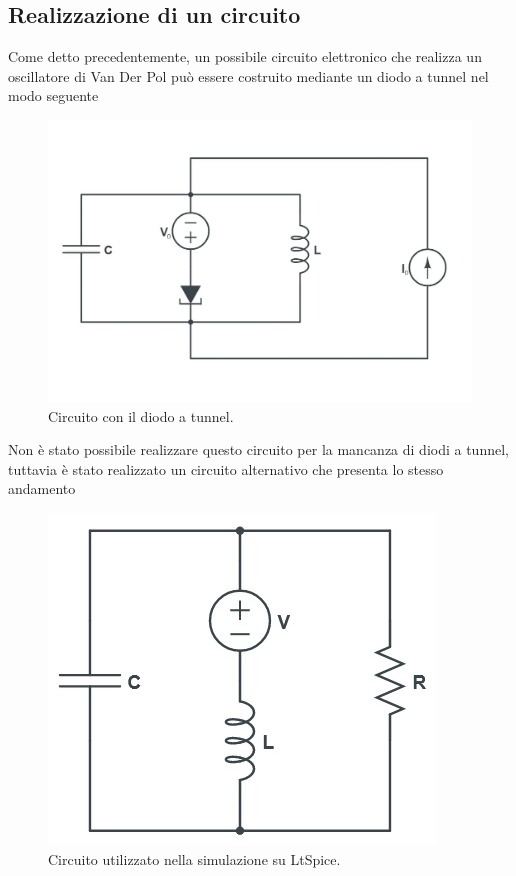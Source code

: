 \documentclass[12pt]{article}
\begin{document}
\subsection{Realizzazione di un circuito}
Come detto precedentemente, un possibile circuito elettronico che realizza un oscillatore di Van Der Pol può essere costruito mediante un diodo a tunnel nel modo seguente 
\begin{figure}[H]
	\centering
	\includegraphics[scale=0.4]{NotMycircuit}
	\caption{Circuito con il diodo a tunnel.}
\end{figure}
Non è stato possibile realizzare questo circuito per la mancanza di diodi a tunnel, tuttavia è stato realizzato un circuito alternativo che presenta lo stesso andamento 
\begin{figure}[H]
	\centering
	\includegraphics[scale=0.8]{Mycircuit}
	\caption{Circuito utilizzato nella simulazione su LtSpice.}
\end{figure}
\end{document}
